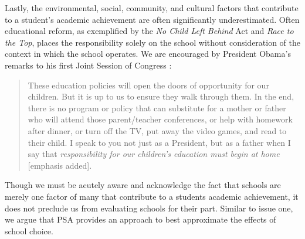 \documentclass[letterpaper,12p,twoside]{article} %
\renewcommand{\normalsize}{\fontsize{12}{13}\selectfont}
\begin{document}
Lastly, the environmental, social, community, and cultural factors that contribute to a student's academic achievement are often significantly underestimated. Often educational reform, as exemplified by the \textit{No Child Left Behind} Act and \textit{Race to the Top}, places the responsibility solely on the school without consideration of the context in which the school operates. We are encouraged by President Obama's remarks to his first Joint Session of Congress \cite{obama}:

\begin{quote} \normalsize
These education policies will open the doors of opportunity for our children. But it is up to us to ensure they walk through them. In the end, there is no program or policy that can substitute for a mother or father who will attend those parent/teacher conferences, or help with homework after dinner, or turn off the TV, put away the video games, and read to their child. I speak to you not just as a President, but as a father when I say that \textit{responsibility for our children's education must begin at home} [emphasis added].
\end{quote}

\noindent Though we must be acutely aware and acknowledge the fact that schools are merely one factor of many that contribute to a students academic achievement, it does not preclude us from evaluating schools for their part. Similar to issue one, we argue that PSA provides an approach to best approximate the effects of school choice.


\end{document}
